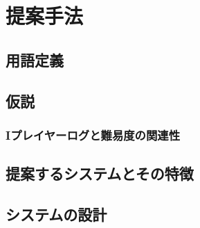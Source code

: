 \chapter{提案手法}
\section{用語定義}
\section{仮説}
\subsection{Iプレイヤーログと難易度の関連性}
\section{提案するシステムとその特徴}
\section{システムの設計}
